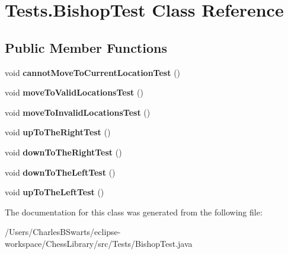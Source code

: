 \hypertarget{class_tests_1_1_bishop_test}{}\section{Tests.\+Bishop\+Test Class Reference}
\label{class_tests_1_1_bishop_test}
\subsection*{Public Member Functions}
\begin{DoxyCompactItemize}
\item 
\mbox{\label{class_tests_1_1_bishop_test_ab00adb5639306021f32a58f6bc623f45}} 
void {\bfseries cannot\+Move\+To\+Current\+Location\+Test} ()
\item 
\mbox{\label{class_tests_1_1_bishop_test_a0684ff2350c3ab8a0e938f135a516453}} 
void {\bfseries move\+To\+Valid\+Locations\+Test} ()
\item 
\mbox{\label{class_tests_1_1_bishop_test_ae926df81df4a15492ad7d92c2080f156}} 
void {\bfseries move\+To\+Invalid\+Locations\+Test} ()
\item 
\mbox{\label{class_tests_1_1_bishop_test_a6f92af0356f98f4a25e13b51562965a3}} 
void {\bfseries up\+To\+The\+Right\+Test} ()
\item 
\mbox{\label{class_tests_1_1_bishop_test_a849ce7c7e62043925de4f38e085aecef}} 
void {\bfseries down\+To\+The\+Right\+Test} ()
\item 
\mbox{\label{class_tests_1_1_bishop_test_a345d82dd66b18a90abb348d3f5ee86d7}} 
void {\bfseries down\+To\+The\+Left\+Test} ()
\item 
\mbox{\label{class_tests_1_1_bishop_test_a9807d86b86cf5a525aaac34e98c2c3e1}} 
void {\bfseries up\+To\+The\+Left\+Test} ()
\end{DoxyCompactItemize}


The documentation for this class was generated from the following file\+:\begin{DoxyCompactItemize}
\item 
/\+Users/\+Charles\+B\+Swarts/eclipse-\/workspace/\+Chess\+Library/src/\+Tests/Bishop\+Test.\+java\end{DoxyCompactItemize}
